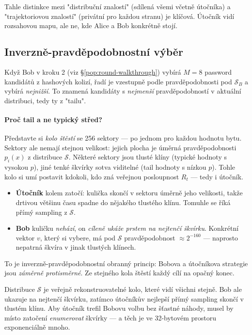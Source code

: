 \documentclass[11pt,a4paper]{article}
\begin{document}
Tahle distinkce mezi "distribuční znalostí" (sdílená všemi včetně útočníka) a "trajektoriovou znalostí" (privátní pro každou stranu) je klíčová. Útočník vidí rozsahovou mapu, ale ne, kde Alice a Bob konkrétně stojí.

\subsection{Inverzně-pravděpodobnostní výběr}

Když Bob v kroku 2 (viz §\ref{pop:round-walkthrough}) vybírá $M = 8$ password kandidátů z hashových kolizí, řadí je vzestupně podle pravděpodobnosti pod $\mathcal{S}_B$ a vybírá \emph{nejnižší}. To znamená kandidáty s \emph{nejmenší} pravděpodobností v aktuální distribuci, tedy ty z "tailu".

\paragraph{Proč tail a ne typický střed?} Představte si \emph{kolo štěstí} se 256 sektory --- po jednom pro každou hodnotu bytu. Sektory ale nemají stejnou velikost: jejich plocha je úměrná pravděpodobnosti $p_i(x)$ z distribuce $\mathcal{S}$. Některé sektory jsou tlusté klíny (typické hodnoty s vysokou $p$), jiné tenké škvírky sotva viditelné (tail hodnoty s nízkou $p$). Tohle kolo si umí postavit kdokoli, kdo zná veřejnou posloupnost $R_t$ --- tedy i útočník.

\begin{itemize}[leftmargin=*]
\item \textbf{Útočník} kolem zatočí: kulička skončí v sektoru úměrně jeho velikosti, takže drtivou většinu času spadne do nějakého tlustého klínu. Tomuhle se říká přímý sampling z $\mathcal{S}$.
\item \textbf{Bob} kuličku \emph{nehází}, on \emph{cíleně ukáže prstem na nejtenčí škvírku}. Konkrétní vektor $v$, který si vybere, má pod $\mathcal{S}$ pravděpodobnost $\approx 2^{-160}$ --- naprosto nepatrná škvíra v jinak tlustých klínech.
\end{itemize}

To je inverzně-pravděpodobnostní obranný princip: Bobova a útočníkova strategie jsou \emph{záměrně protisměrné}. Ze stejného kola štěstí každý cílí na opačný konec.

\begin{aha}
Distribuce $\mathcal{S}$ je veřejně rekonstruovatelné kolo, které vidí všichni stejně. Bob ale ukazuje na nejtenčí škvírku, zatímco útočníkův nejlepší přímý sampling skončí v tlustém klínu. Aby útočník trefil Bobovu volbu bez šťastné náhody, musel by místo zatočení \emph{enumerovat} škvírky --- a těch je ve 32-bytovém prostoru exponenciálně mnoho.
\end{aha}
\end{document}
